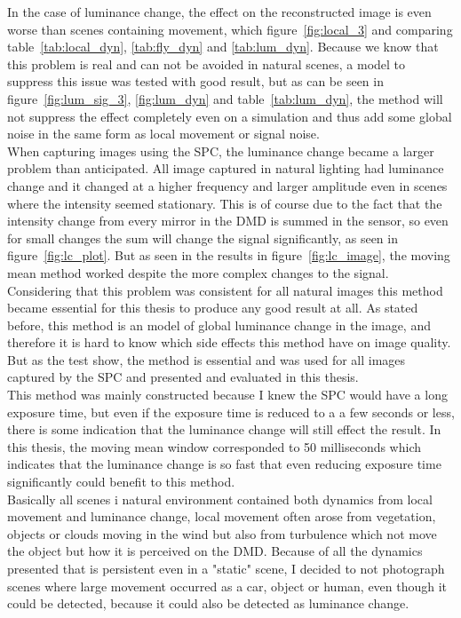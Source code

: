 In the case of luminance change, the effect on the reconstructed image is even worse than scenes containing movement, which figure~\ref{fig:local_3} and comparing table~\ref{tab:local_dyn}, \ref{tab:fly_dyn} and \ref{tab:lum_dyn}. Because we know that this problem is real and can not be avoided in natural scenes, a model to suppress this issue was tested with good result, but as can be seen in figure~\ref{fig:lum_sig_3}, \ref{fig:lum_dyn} and table~\ref{tab:lum_dyn}, the method will not suppress the effect completely even on a simulation and thus add some global noise in the same form as local movement or signal noise.\\[0.1in]

When capturing images using the SPC, the luminance change became a larger problem than anticipated. All image captured in natural lighting had luminance change and it changed at a higher frequency and larger amplitude even in scenes where the intensity seemed stationary. This is of course due to the fact that the intensity change from every mirror in the DMD is summed in the sensor, so even for small changes the sum will change the signal significantly, as seen in figure~\ref{fig:lc_plot}. But as seen in the results in figure~\ref{fig:lc_image}, the moving mean method worked despite the more complex changes to the signal. Considering that this problem was consistent for all natural images this method became essential for this thesis to produce any good result at all. As stated before, this method is an model of global luminance change in the image, and therefore it is hard to know which side effects this method have on image quality. But as the test show, the method is essential and was used for all images captured by the SPC and presented and evaluated in this thesis.\\[0.1in]

This method was mainly constructed because I knew the SPC would have a long exposure time, but even if the exposure time is reduced to a a few seconds or less, there is some indication that the luminance change will still effect the result. In this thesis, the moving mean window corresponded to 50 milliseconds which indicates that the luminance change is so fast that even reducing exposure time significantly could benefit to this method.\\[0.1in]


Basically all scenes i natural environment contained both dynamics from local movement and luminance change, local movement often arose from vegetation, objects or clouds moving in the wind but also from turbulence which not move the object but how it is perceived on the DMD. Because of all the dynamics presented that is persistent even in a "static" scene, I decided to not photograph scenes where large movement occurred as a car, object or human, even though it could be detected, because it could also be detected as luminance change.\\[0.1in]

